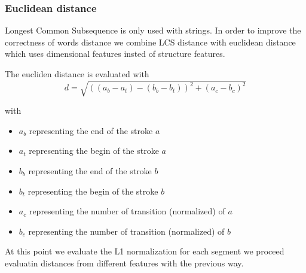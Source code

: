 \subsubsection{Euclidean distance} 

Longest Common Subsequence is only used with strings. In order to improve the correctness of words distance we combine LCS distance with euclidean distance which uses dimensional features insted of structure features.

The eucliden distance is evaluated with
$$d = \sqrt{((a_b - a_t)−(b_b - b_t))^2 +(a_c - b_c)^2}$$

with

\begin{itemize}
\item $a_b$ representing the end of the stroke $a$
\item $a_t$ representing the begin of the stroke $a$
\item $b_b$ representing the end of the stroke $b$
\item $b_t$ representing the begin of the stroke $b$
\item $a_c$ representing the number of transition (normalized) of $a$
\item $b_c$ representing the number of transition (normalized) of $b$
\end{itemize}

At this point we evaluate the L1 normalization for each segment we proceed evaluatin distances from different features with the previous way.